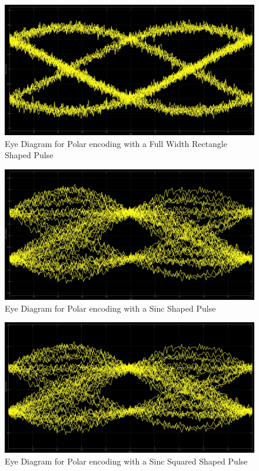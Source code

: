 \documentclass{article}
\begin{document}
\begin{figure}[H]
  \includegraphics[width = \linewidth]{Polar_Sin_Eye.jpg}
  \caption{Eye Diagram for Polar encoding with a Full Width Rectangle Shaped Pulse}
  \label{fig:Polar-Sin-Eye}
\end{figure}
\begin{figure}[H]
  \includegraphics[width = \linewidth]{Polar_Sinc_Eye.jpg}
  \caption{Eye Diagram for Polar encoding with a Sinc Shaped Pulse}
  \label{fig:Polar-Sinc-Eye}
\end{figure}
\begin{figure}[H]
  \includegraphics[width = \linewidth]{Polar_Squared_Eye.jpg}
  \caption{Eye Diagram for Polar encoding with a Sinc Squared Shaped Pulse}
  \label{fig:Polar-Squared-Eye}
\end{figure}
\end{document}
